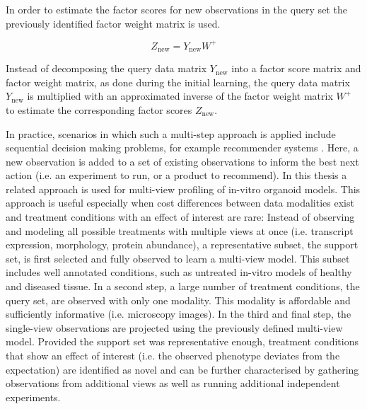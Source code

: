 \begin{flushleft}
In order to estimate the factor scores for new observations in the query set the previously identified factor weight matrix is used. 

\begin{equation}
    Z_{\text{new}} = Y_{\text{new}} W^+
\end{equation}

Instead of decomposing the query data matrix \(Y_{\text{new}}\) into a factor score matrix and factor weight matrix, as done during the initial learning, the query data matrix  \(Y_{\text{new}}\) is multiplied with an approximated inverse of the factor weight matrix \( W^+ \) to estimate the corresponding factor scores \( Z_{\text{new}} \).
\par

In practice, scenarios in which such a multi-step approach is applied include sequential decision making problems, for example recommender systems \citep{korenMatrixFactorizationTechniques2009}. Here, a new observation is added to a set of existing observations to inform the best next action (i.e. an experiment to run, or a product to recommend). In this thesis a related approach is used for multi-view profiling of in-vitro organoid models. This approach is useful especially when cost differences between data modalities exist and treatment conditions with an effect of interest are rare: Instead of observing and modeling all possible treatments with multiple views at once (i.e. transcript expression, morphology, protein abundance), a representative subset, the support set, is first selected and fully observed to learn a multi-view model. This subset includes well annotated conditions, such as untreated in-vitro models of healthy and diseased tissue. In a second step, a large number of treatment conditions, the query set, are observed with only one modality. This modality is affordable and sufficiently informative (i.e. microscopy images). In the third and final step, the single-view observations are projected using the previously defined multi-view model. Provided the support set was representative enough, treatment conditions that show an effect of interest (i.e. the observed phenotype deviates from the expectation) are identified as novel and can be further characterised by gathering observations from additional views as well as running additional independent experiments.


\end{flushleft}
